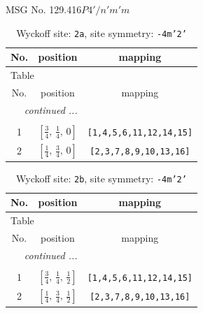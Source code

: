 \documentclass[fleqn,8pt]{jsarticle}
\begin{document}
\setcounter{MaxMatrixCols}{32}

\renewcommand{\tablename}{Table~}
\renewcommand{\figurename}{Figure~}
\begin{center}
\LARGE
MSG No. 129.416\quad$P4'/n'm'm$
\end{center}
\renewcommand{\arraystretch}{1.2}
\begin{longtable}{ccc}
\caption{Wyckoff site: {\tt 2a}, site symmetry: {\tt -4m'2'}}
 \\
 \hline \hline
No. & position & mapping \\ \hline \endfirsthead

\multicolumn{2}{l}{\tablename\ \thetable{}} \\
 \hline \hline
No. & position & mapping \\ \hline \endhead

 \hline \hline
\multicolumn{2}{r}{\footnotesize\it continued ...} \\ \endfoot

 \hline \hline
\multicolumn{2}{r}{} \\ \endlastfoot

1 & $\left[ \frac{3}{4},\, \frac{1}{4},\, 0 \right]$ & {\tt [1,4,5,6,11,12,14,15]} \\ \hline
2 & $\left[ \frac{1}{4},\, \frac{3}{4},\, 0 \right]$ & {\tt [2,3,7,8,9,10,13,16]} \\
\end{longtable}
\renewcommand{\arraystretch}{1.2}
\begin{longtable}{ccc}
\caption{Wyckoff site: {\tt 2b}, site symmetry: {\tt -4m'2'}}
 \\
 \hline \hline
No. & position & mapping \\ \hline \endfirsthead

\multicolumn{2}{l}{\tablename\ \thetable{}} \\
 \hline \hline
No. & position & mapping \\ \hline \endhead

 \hline \hline
\multicolumn{2}{r}{\footnotesize\it continued ...} \\ \endfoot

 \hline \hline
\multicolumn{2}{r}{} \\ \endlastfoot

1 & $\left[ \frac{3}{4},\, \frac{1}{4},\, \frac{1}{2} \right]$ & {\tt [1,4,5,6,11,12,14,15]} \\ \hline
2 & $\left[ \frac{1}{4},\, \frac{3}{4},\, \frac{1}{2} \right]$ & {\tt [2,3,7,8,9,10,13,16]} \\
\end{longtable}
\end{document}
